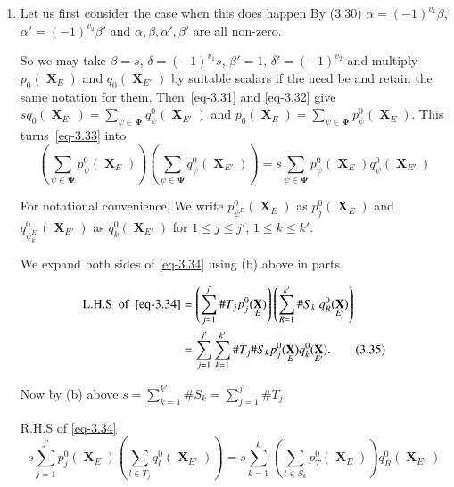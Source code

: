 \documentclass[a4paper,12pt]{article}
\DeclareMathOperator{\x}{\mathrm{X}}
\theoremstyle{definition}
\theoremstyle{underlinethm}
\theoremstyle{definition}
\begin{document}
\begin{enumerate}[label=(\alph*)]
 \item Let us first consider the case when this does happen By (3.30) $\alpha = (-1)^{v_{1}} \beta$, $\alpha' = (-1)^{v_{2}} \beta'$ and $\alpha, \beta, \alpha', \beta'$ are all non-zero.
 
 So we may take $\beta = s$, $\delta = (-1)^{v_{1}} s$, $\beta' = 1$, $\delta' = (-1)^{v_{2}}$ and multiply $p_{0}(\boldsymbol{\x}_{E})$ and $q_{0}(\boldsymbol{\x}_{E'})$ by suitable scalars if the need be and retain the same notation for them. Then~\eqref{eq-3.31} and \eqref{eq-3.32} give $s q_{0}(\boldsymbol{\x}_{E'}) = \sum\limits_{\psi \in \boldsymbol{\Psi}} q_{\psi}^{0} (\boldsymbol{\x}_{E'})$ and $p_{0}(\boldsymbol{\x}_{E}) = \sum\limits_{\psi \in \boldsymbol{\Psi}} p^{0}_{\psi}(\boldsymbol{\x}_{E})$. This turns~\eqref{eq-3.33} into
 \begin{equation}
 \left(\sum_{\psi \in \boldsymbol{\Psi}} p^{0}_{\psi}(\boldsymbol{\x}_{E})\right) \left(\sum_{\psi \in \boldsymbol{\Psi}} q^{0}_{\psi} (\boldsymbol{\x}_{E'})\right) = s \sum_{\psi \in \boldsymbol{\Psi}} p^{0}_{\psi} (\boldsymbol{\x}_{E}) q^{0}_{\psi}(\boldsymbol{\x}_{E'})\tag{3.34}\label{eq-3.34} 
  \end{equation}

For notational convenience, We write $p_{\psi^{E}}^{0} (\boldsymbol{\x}_{E})$ as $p^{0}_{j}(\boldsymbol{\x}_{E})$ and $q^{0}_{\psi_{k}^{E'}} (\boldsymbol{\x}_{E'})$ as $q_{k}^{0}(\boldsymbol{\x}_{E'})$ for $1\leq j \leq j'$, $1\leq k \leq k'$. 

We expand both sides of \eqref{eq-3.34} using (b) above in parts.

\begin{align*}
\text{L.H.S}~~\text{of}~~{\eqref{eq-3.34}} &= \left(\sum_{j=1}^{j'}  \# T_{j} p_{j}^{0}(\boldsymbol{\x}_{E})\right)\left(\sum_{R=1}^{k'} \#S_{k}~ q_{R}^{0}(\boldsymbol{\x}_{E'})\right)\\
&= \sum_{j=1}^{j'} \sum_{k=1}^{k'} \# T_{j} \#S_{k} p_{j}^{0}(\boldsymbol{\x}_{E}) q_{k}^{0}(\boldsymbol{\x}_{E'}).\tag{3.35}\label{eq-3.35}
\end{align*}

Now by (b) above $s= \sum_{k=1}^{k'} \# S_{k} = \sum_{j=1}^{j'} \# T_{j}$.

R.H.S of \eqref{eq-3.34}
\begin{equation}
s\sum_{j=1}^{j'} p_{j}^{0} (\boldsymbol{\x}_{E}) \left(\sum_{l \in T_{j}} q_{l}^{0}(\boldsymbol{\x}_{E'})\right) = s\sum_{k=1}^{k}  \left(\sum_{t \in S_{k}}  p_{T}^{0} (\boldsymbol{\x}_{E})\right) q_{R}^{0} (\boldsymbol{\x}_{E'})\tag{3.36}\label{eq-3.36}
\end{equation}


\end{enumerate}
\end{document}
